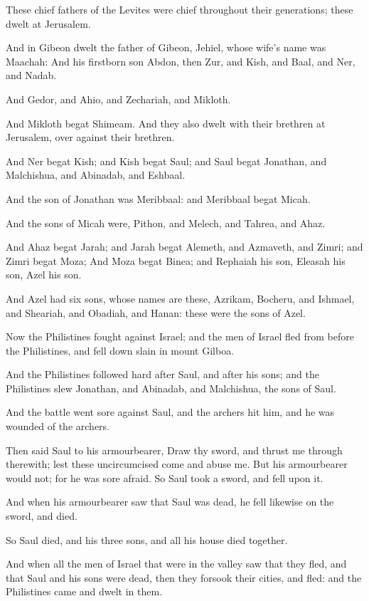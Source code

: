 \Verse These chief fathers of the Levites were chief throughout their generations; these dwelt at Jerusalem.

\Verse And in Gibeon dwelt the father of Gibeon, Jehiel, whose wife's name was Maachah: \Verse And his firstborn son Abdon, then Zur, and Kish, and Baal, and Ner, and Nadab.

\Verse And Gedor, and Ahio, and Zechariah, and Mikloth.

\Verse And Mikloth begat Shimeam. And they also dwelt with their brethren at Jerusalem, over against their brethren.

\Verse And Ner begat Kish; and Kish begat Saul; and Saul begat Jonathan, and Malchishua, and Abinadab, and Eshbaal.

\Verse And the son of Jonathan was Meribbaal: and Meribbaal begat Micah.

\Verse And the sons of Micah were, Pithon, and Melech, and Tahrea, and Ahaz.

\Verse And Ahaz begat Jarah; and Jarah begat Alemeth, and Azmaveth, and Zimri; and Zimri begat Moza; \Verse And Moza begat Binea; and Rephaiah his son, Eleasah his son, Azel his son.

\Verse And Azel had six sons, whose names are these, Azrikam, Bocheru, and Ishmael, and Sheariah, and Obadiah, and Hanan: these were the sons of Azel.


\Chapter
\Verse Now the Philistines fought against Israel; and the men of Israel fled from before the Philistines, and fell down slain in mount Gilboa.

\Verse And the Philistines followed hard after Saul, and after his sons; and the Philistines slew Jonathan, and Abinadab, and Malchishua, the sons of Saul.

\Verse And the battle went sore against Saul, and the archers hit him, and he was wounded of the archers.

\Verse Then said Saul to his armourbearer, Draw thy sword, and thrust me through therewith; lest these uncircumcised come and abuse me. But his armourbearer would not; for he was sore afraid. So Saul took a sword, and fell upon it.

\Verse And when his armourbearer saw that Saul was dead, he fell likewise on the sword, and died.

\Verse So Saul died, and his three sons, and all his house died together.

\Verse And when all the men of Israel that were in the valley saw that they fled, and that Saul and his sons were dead, then they forsook their cities, and fled: and the Philistines came and dwelt in them.

